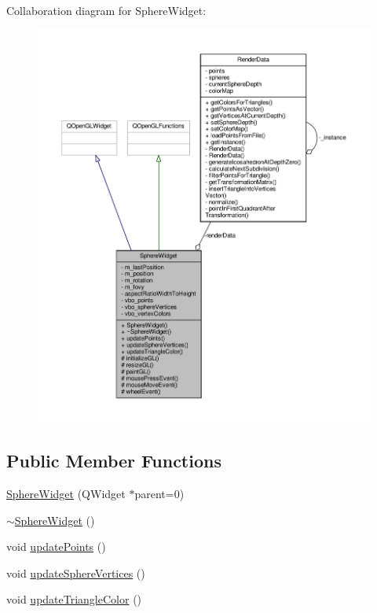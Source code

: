 Collaboration diagram for Sphere\+Widget\+:
\nopagebreak
\begin{figure}[H]
\begin{center}
\leavevmode
\includegraphics[width=350pt]{class_sphere_widget__coll__graph}
\end{center}
\end{figure}
\subsection*{Public Member Functions}
\begin{DoxyCompactItemize}
\item 
\hyperlink{class_sphere_widget_a6ee7b3a4b58e5d62fb1c901aafdd1790}{Sphere\+Widget} (Q\+Widget $\ast$parent=0)
\item 
\hyperlink{class_sphere_widget_a1766e5d68f4c57f52d6b1ee40cc0326c}{$\sim$\+Sphere\+Widget} ()
\item 
void \hyperlink{class_sphere_widget_a692ca1c1e7556f6abd7b5f6a49a2557c}{update\+Points} ()
\item 
void \hyperlink{class_sphere_widget_a7d132800fb4d6b7b925c253679bb6445}{update\+Sphere\+Vertices} ()
\item 
void \hyperlink{class_sphere_widget_a871c5252a7a218c5d405be5dfc3dbfa1}{update\+Triangle\+Color} ()
\end{DoxyCompactItemize}
